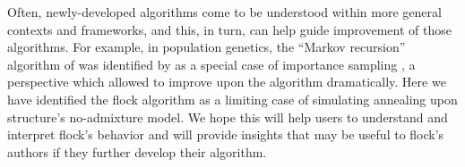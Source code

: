 Often, newly-developed algorithms come to be understood within more general contexts and 
frameworks, and this, in turn, can help guide improvement of those algorithms.  For example, in population
genetics, the ``Markov recursion'' algorithm of \citet{Gri&Tav1994-AI} was identified by \citet{Felsensteinetal1999} 
as a special case of importance sampling \citep{Ham&Han1964}, a perspective which allowed 
\citet{Ste&Don2000} to improve upon the algorithm dramatically.  Here we have identified the {\sc flock}
algorithm as a limiting case of simulating annealing upon {\sc structure}'s no-admixture model. We hope this will
help users to understand and interpret {\sc flock}'s behavior and will provide insights that may be useful 
to {\sc flock}'s authors if they further develop their algorithm.   

 
